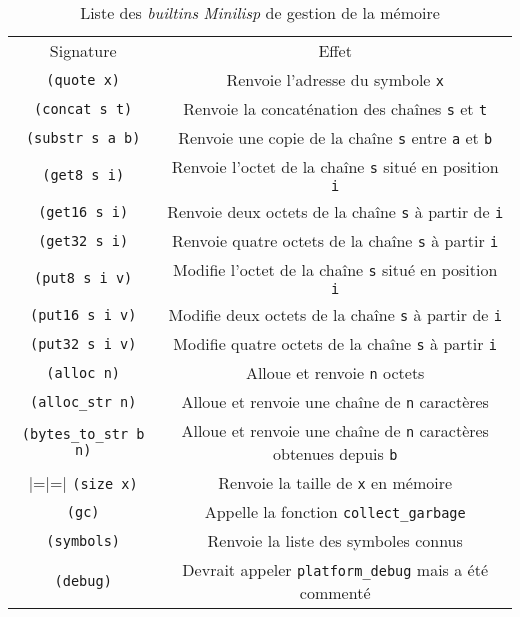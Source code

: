 \documentclass[a4paper, 10pt, french]{article}
\newcommand{\codeC}[1]{\texttt{#1}}
\newcommand{\codeLisp}[1]{\texttt{#1}}
\newcommand{\foreign}[1]{\emph{#1}}
\begin{document}
\begin{table}[H]
  \centering
  \begin{tabularx}{\linewidth}{|C|C|}
    \hline
    Signature & Effet \tabularnewline
    \hhline{|=|=|}
    \codeLisp{(quote x)} & Renvoie l'adresse du symbole \codeLisp{x} \tabularnewline
    \hline
    \codeLisp{(concat s t)} & Renvoie la concaténation des chaînes \codeLisp{s} et \codeLisp{t} \tabularnewline
    \hline
    \codeLisp{(substr s a b)} & Renvoie une copie de la chaîne \codeLisp{s} entre \codeLisp{a} et \codeLisp{b} \tabularnewline
    \hhline{|=|=|}
    \codeLisp{(get8 s i)} & Renvoie l'octet de la chaîne \codeLisp{s} situé en position \codeLisp{i} \tabularnewline
    \hline
    \codeLisp{(get16 s i)} & Renvoie deux octets de la chaîne \codeLisp{s} à partir de \codeLisp{i} \tabularnewline
    \hline
    \codeLisp{(get32 s i)} & Renvoie quatre octets de la chaîne \codeLisp{s} à partir \codeLisp{i} \tabularnewline
    \hline
    \codeLisp{(put8 s i v)} & Modifie l'octet de la chaîne \codeLisp{s} situé en position \codeLisp{i} \tabularnewline
    \hline
    \codeLisp{(put16 s i v)} & Modifie deux octets de la chaîne \codeLisp{s} à partir de \codeLisp{i} \tabularnewline
    \hline
    \codeLisp{(put32 s i v)} & Modifie quatre octets de la chaîne \codeLisp{s} à partir \codeLisp{i} \tabularnewline
    \hhline{|=|=|}
    \codeLisp{(alloc n)} & Alloue et renvoie \codeLisp{n} octets \tabularnewline
    \hline
    \codeLisp{(alloc_str n)} & Alloue et renvoie une chaîne de \codeLisp{n} caractères \tabularnewline
    \hline
    \codeLisp{(bytes_to_str b n)} & Alloue et renvoie une chaîne de \codeLisp{n} caractères obtenues depuis \codeLisp{b} \tabularnewline
    \hline{|=|=|}
    \codeLisp{(size x)} & Renvoie la taille de \codeLisp{x} en mémoire \tabularnewline
    \hline
    \codeLisp{(gc)} & Appelle la fonction \codeC{collect_garbage} \tabularnewline
    \hline
    \codeLisp{(symbols)} & Renvoie la liste des symboles connus \tabularnewline
    \hline
    \codeLisp{(debug)} & Devrait appeler \codeC{platform_debug} mais a été commenté \tabularnewline
    \hline
  \end{tabularx}
  \caption{Liste des \foreign{builtins} \foreign{Minilisp} de gestion de la mémoire}
\end{table}
\end{document}
